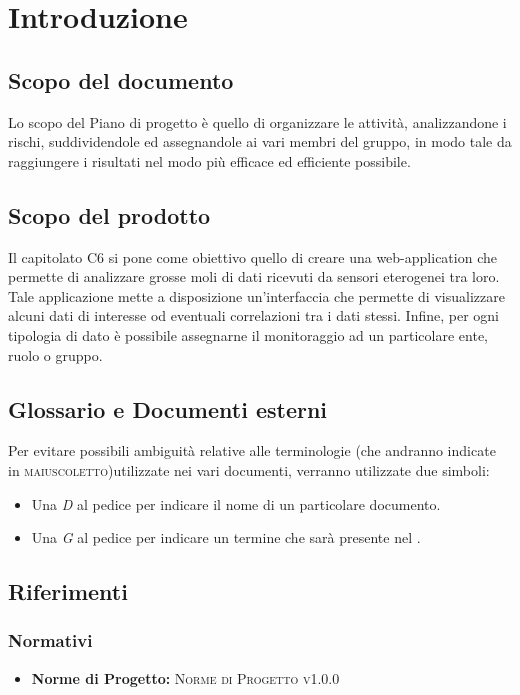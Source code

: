\section{Introduzione}

	\subsection{Scopo del documento}
		Lo scopo del Piano di progetto è quello di organizzare le attività, analizzandone i rischi, suddividendole ed assegnandole ai vari membri del gruppo, in modo tale da raggiungere i risultati nel modo più efficace ed efficiente possibile. 
	\subsection{Scopo del prodotto}
		Il capitolato C6 si pone come obiettivo quello di creare una web-application che permette di analizzare grosse moli di dati ricevuti da sensori eterogenei tra loro. Tale applicazione mette a disposizione un'interfaccia che permette di visualizzare alcuni dati di interesse od eventuali correlazioni tra i dati stessi. Infine, per ogni tipologia di dato è possibile assegnarne il monitoraggio ad un particolare ente, ruolo o gruppo.
	\subsection{Glossario e Documenti esterni}
		Per evitare possibili ambiguità relative alle terminologie (che andranno indicate in \textsc{maiuscoletto})utilizzate nei vari documenti, verranno utilizzate due simboli:
		\begin{itemize}
			\item Una \textit{D} al pedice per indicare il nome di un particolare documento.
			\item Una \textit{G} al pedice per indicare un termine che sarà presente nel .
		\end{itemize}
	\subsection{Riferimenti}
		\subsubsection{Normativi}
		\begin{itemize}
			\item \textbf{Norme di Progetto: }\textsc{Norme di Progetto v1.0.0} 
		\end{itemize}
			
